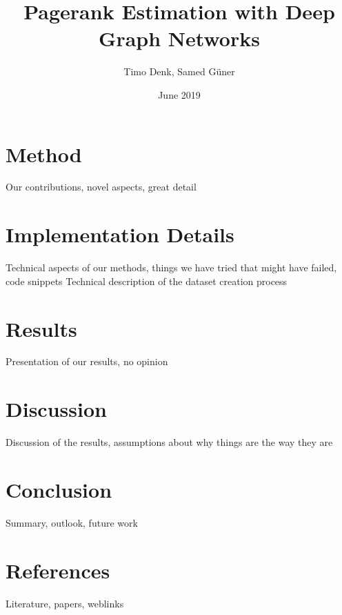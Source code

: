\documentclass{article}
\title{Pagerank Estimation with Deep Graph Networks}
\author{Timo Denk, Samed Güner}
\date{June 2019}
\begin{document}
\maketitle





\section{Method}
Our contributions, novel aspects, great detail



\section{Implementation Details}
Technical aspects of our methods, things we have tried that might have failed, code snippets
Technical description of the dataset creation process


\section{Results}
Presentation of our results, no opinion

\section{Discussion}
Discussion of the results, assumptions about why things are the way they are

\section{Conclusion}
Summary, outlook, future work

\section{References}
Literature, papers, weblinks
\printbibliography
\end{document}
